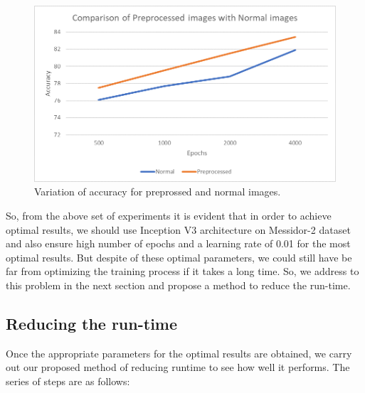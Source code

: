 \documentclass[12pt]{report}
\begin{document}
\begin{figure}[h]
\centering
\includegraphics[width=1\textwidth]{Paint3}
\caption{Variation of accuracy for preprossed and normal images.}
\label{fig:test10}
\end{figure}


\noindent So, from the above set of experiments it is evident that in order to achieve optimal results, we should use Inception V3 architecture on Messidor-2 dataset and also ensure high number of epochs and a learning rate of 0.01 for the most optimal results. But despite of these optimal parameters, we could still have be far from optimizing the training process if it takes a long time. So, we address to this problem in the next section and propose a method to reduce the run-time.

\subsection{Reducing the run-time}

Once the appropriate parameters for the optimal results are obtained, we carry out our proposed method of reducing runtime to see how well it performs. The series of steps are as follows:
\end{document}
